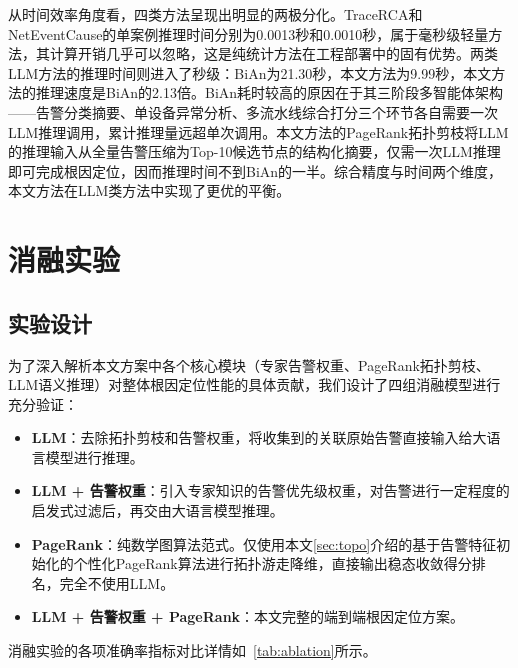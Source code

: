 从时间效率角度看，四类方法呈现出明显的两极分化。TraceRCA和NetEventCause的单案例推理时间分别为0.0013秒和0.0010秒，属于毫秒级轻量方法，其计算开销几乎可以忽略，这是纯统计方法在工程部署中的固有优势。两类LLM方法的推理时间则进入了秒级：BiAn为21.30秒，本文方法为9.99秒，本文方法的推理速度是BiAn的2.13倍。BiAn耗时较高的原因在于其三阶段多智能体架构——告警分类摘要、单设备异常分析、多流水线综合打分三个环节各自需要一次LLM推理调用，累计推理量远超单次调用。本文方法的PageRank拓扑剪枝将LLM的推理输入从全量告警压缩为Top-10候选节点的结构化摘要，仅需一次LLM推理即可完成根因定位，因而推理时间不到BiAn的一半。综合精度与时间两个维度，本文方法在LLM类方法中实现了更优的平衡。

\section{消融实验}
\subsection{实验设计}
为了深入解析本文方案中各个核心模块（专家告警权重、PageRank拓扑剪枝、LLM语义推理）对整体根因定位性能的具体贡献，我们设计了四组消融模型进行充分验证：
\begin{itemize}
    \item \textbf{LLM}：去除拓扑剪枝和告警权重，将收集到的关联原始告警直接输入给大语言模型进行推理。
    \item \textbf{LLM + 告警权重}：引入专家知识的告警优先级权重，对告警进行一定程度的启发式过滤后，再交由大语言模型推理。
    \item \textbf{PageRank}：纯数学图算法范式。仅使用本文\ref{sec:topo}介绍的基于告警特征初始化的个性化PageRank算法进行拓扑游走降维，直接输出稳态收敛得分排名，完全不使用LLM。
    \item \textbf{LLM + 告警权重 + PageRank}：本文完整的端到端根因定位方案。
\end{itemize}

消融实验的各项准确率指标对比详情如~\ref{tab:ablation}所示。

\begin{table}[htbp]
\centering
\caption{本文方法各组件的定位准确率对比}
\label{tab:ablation}
\end{table}

